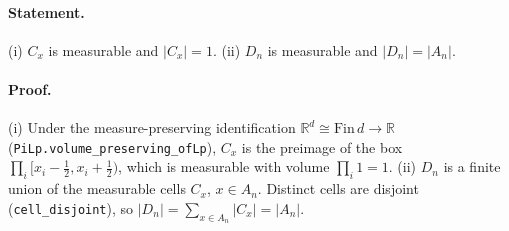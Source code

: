 \paragraph{Statement.} (i) $C_x$ is measurable and $|C_x|=1$. (ii) $D_n$ is measurable and
$|D_n|=|A_n|$.
\paragraph{Proof.} (i) Under the measure-preserving identification $\mathbb R^d\cong\mathrm{Fin}\,d\to\mathbb R$
(\texttt{PiLp.volume\_preserving\_ofLp}), $C_x$ is the preimage of the box
$\prod_i[x_i-\tfrac12,x_i+\tfrac12)$, which is measurable with volume $\prod_i 1=1$.
(ii) $D_n$ is a finite union of the measurable cells $C_x$, $x\in A_n$. Distinct cells are
disjoint (\texttt{cell\_disjoint}), so $|D_n|=\sum_{x\in A_n}|C_x|=|A_n|$.
